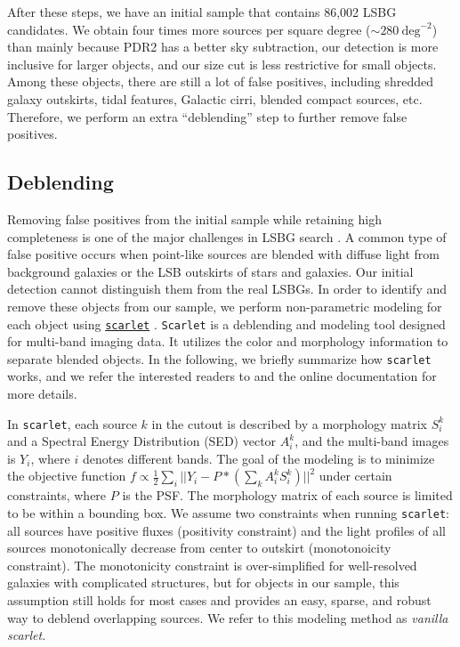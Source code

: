 \documentclass[twocolumn,astrosymb,twocolappendix]{aastex631}
\newcommand{\code}[1]{\texttt{#1}}
\begin{document}
\begin{CJK*}{UTF8}{gbsn}
\vspace{2em}
After these steps, we have an initial sample that contains 86,002 LSBG candidates. We obtain four times more sources per square degree ($\sim 280\ \mathrm{deg}^{-2}$) than  mainly because PDR2 has a better sky subtraction,  our detection is more inclusive for larger objects, and our size cut is less restrictive for small objects. Among these objects, there are still a lot of false positives, including shredded galaxy outskirts, tidal features, Galactic cirri, blended compact sources, etc. Therefore, we perform an extra ``deblending'' step to further remove false positives.  

\subsection{Deblending}\label{sec:deblending}
Removing false positives from the initial sample while retaining high completeness is one of the major challenges in LSBG search \citep[e.g.,][]{vanDokkum2015,Koda2015,Yagi2016,Greco2018,SAGA-I,Zaritsky2019,Zaritsky2021,Tanoglidis2021,Zaritsky2022}. A common type of false positive occurs when point-like sources are blended with diffuse light from background galaxies or the LSB outskirts of stars and galaxies. Our initial detection cannot distinguish them from the real LSBGs. In order to identify and remove these objects from our sample, we perform non-parametric modeling for each object using \href{https://pmelchior.github.io/scarlet/}{\code{scarlet}} \citep{Melchior2018}. \code{Scarlet} is a deblending and modeling tool designed for multi-band imaging data. It utilizes the color and morphology information to separate blended objects. In the following, we briefly summarize how \code{scarlet} works, and we refer the interested readers to \citet{Melchior2018,Melchior2021} and the online documentation for more details. 

In \code{scarlet}, each source $k$ in the cutout is described by a morphology matrix $S^k_i$ and a Spectral Energy Distribution (SED) vector $A^k_i$, and the multi-band images is $Y_i$, where $i$ denotes different bands. The goal of the modeling is to minimize the objective function $f \propto \frac{1}{2}\sum_i ||Y_i - P \ast (\sum_k A^k_i S^k_i)||^{2}$ under certain constraints, where $P$ is the PSF. The morphology matrix of each source is limited to be within a bounding box. We assume two constraints when running \code{scarlet}: all sources have positive fluxes (positivity constraint) and the light profiles of all sources monotonically decrease from center to outskirt (monotonoicity constraint). The monotonicity constraint is over-simplified for well-resolved galaxies with complicated structures, but for objects in our sample, this assumption still holds for most cases and provides an easy, sparse, and robust way to deblend overlapping sources. We refer to this modeling method as \textit{vanilla scarlet}. 


\end{CJK*}
\end{document}
